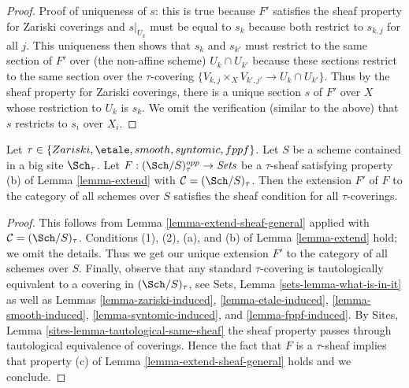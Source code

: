 \begin{proof}
\medskip\noindent
Proof of uniqueness of $s$: this is true because $F'$ satisfies
the sheaf property for Zariski coverings and $s|_{U_k}$ must be equal
to $s_k$ because both restrict to $s_{k, j}$ for all $j$.
This uniqueness then shows that $s_k$ and $s_{k'}$ must restrict
to the same section of $F'$ over (the non-affine scheme) $U_k \cap U_{k'}$
because these sections restrict to the same section over the
$\tau$-covering $\{V_{k, j} \times_X V_{k', j'} \to U_k \cap U_{k'}\}$.
Thus by the sheaf property for Zariski coverings, there is a unique
section $s$ of $F'$ over $X$ whose restriction to $U_k$ is $s_k$.
We omit the verification (similar to the above) that $s$ restricts
to $s_i$ over $X_i$.
\end{proof}

\begin{lemma}
\label{lemma-extend-sheaf}
Let $\tau \in \{Zariski, \etale, smooth, syntomic, fppf\}$.
Let $S$ be a scheme contained in a big site $\Sch_\tau$.
Let $F : (\Sch/S)_\tau^{opp} \to \textit{Sets}$ be a $\tau$-sheaf
satisfying property (b) of Lemma \ref{lemma-extend} with
$\mathcal{C} = (\Sch/S)_\tau$. Then the extension
$F'$ of $F$ to the category of all schemes over $S$
satisfies the sheaf condition for all $\tau$-coverings.
\end{lemma}

\begin{proof}
This follows from Lemma \ref{lemma-extend-sheaf-general}
applied with $\mathcal{C} = (\Sch/S)_\tau$.
Conditions (1), (2), (a), and (b) of Lemma \ref{lemma-extend}
hold; we omit the details. Thus we get our unique extension $F'$
to the category of all schemes over $S$. Finally, observe that
any standard $\tau$-covering is tautologically equivalent to a
covering in $(\Sch/S)_\tau$, see Sets, Lemma \ref{sets-lemma-what-is-in-it}
as well as Lemmas \ref{lemma-zariski-induced},
\ref{lemma-etale-induced},
\ref{lemma-smooth-induced},
\ref{lemma-syntomic-induced}, and
\ref{lemma-fppf-induced}. By
Sites, Lemma \ref{sites-lemma-tautological-same-sheaf}
the sheaf property passes through tautological equivalence
of coverings. Hence the fact that $F$ is a $\tau$-sheaf implies
that property (c) of Lemma \ref{lemma-extend-sheaf-general} holds
and we conclude.
\end{proof}











